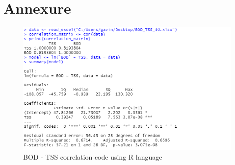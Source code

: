 \newpage
\section*{\centering Annexure}





\begin{figure}[H]
\centering
\includegraphics[width=1\linewidth]{annexure/BOD_TSS_correlation.png}
\caption{BOD - TSS correlation code using R language}
\label{fig:BOD_TSS_Correlation}
\end{figure}

